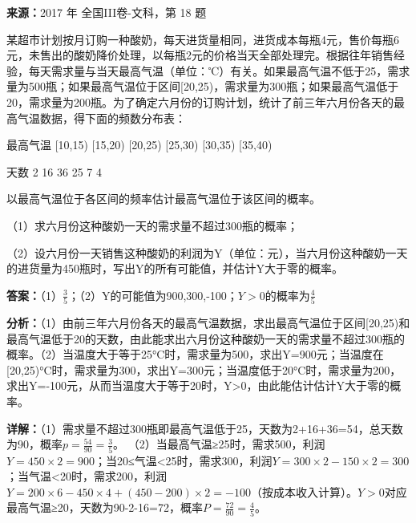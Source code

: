\begin{question}[points=12]
\textbf{来源：}2017 年 全国III卷-文科，第 18 题\par
某超市计划按月订购一种酸奶，每天进货量相同，进货成本每瓶4元，售价每瓶6元，未售出的酸奶降价处理，以每瓶2元的价格当天全部处理完。根据往年销售经验，每天需求量与当天最高气温（单位：℃）有关。如果最高气温不低于25，需求量为500瓶；如果最高气温位于区间[20,25)，需求量为300瓶；如果最高气温低于20，需求量为200瓶。为了确定六月份的订购计划，统计了前三年六月份各天的最高气温数据，得下面的频数分布表：



最高气温  [10,15)  [15,20)  [20,25)  [25,30)  [30,35)  [35,40)

天数       2        16       36       25       7        4



以最高气温位于各区间的频率估计最高气温位于该区间的概率。

（1）求六月份这种酸奶一天的需求量不超过300瓶的概率；

（2）设六月份一天销售这种酸奶的利润为Y（单位：元），当六月份这种酸奶一天的进货量为450瓶时，写出Y的所有可能值，并估计Y大于零的概率。
\begin{solution}
\textbf{答案：}（1）$\frac{3}{5}$；（2）Y的可能值为900,300,-100；$Y>0$的概率为$\frac{4}{5}$

\textbf{分析：}（1）由前三年六月份各天的最高气温数据，求出最高气温位于区间[20,25)和最高气温低于20的天数，由此能求出六月份这种酸奶一天的需求量不超过300瓶的概率。（2）当温度大于等于25°C时，需求量为500，求出Y=900元；当温度在[20,25)°C时，需求量为300，求出Y=300元；当温度低于20°C时，需求量为200，求出Y=-100元，从而当温度大于等于20时，Y>0，由此能估计估计Y大于零的概率。

\textbf{详解：}（1）需求量不超过300瓶即最高气温低于25，天数为2+16+36=54，总天数为90，概率$p=\frac{54}{90}=\frac{3}{5}$。
（2）当最高气温≥25时，需求500，利润$Y=450\times2=900$；当20≤气温<25时，需求300，利润$Y=300\times2-150\times2=300$；当气温<20时，需求200，利润$Y=200\times6-450\times4+(450-200)\times2=-100$（按成本收入计算）。$Y>0$对应最高气温≥20，天数为90-2-16=72，概率$P=\frac{72}{90}=\frac{4}{5}$。
\end{solution}
\end{question}

